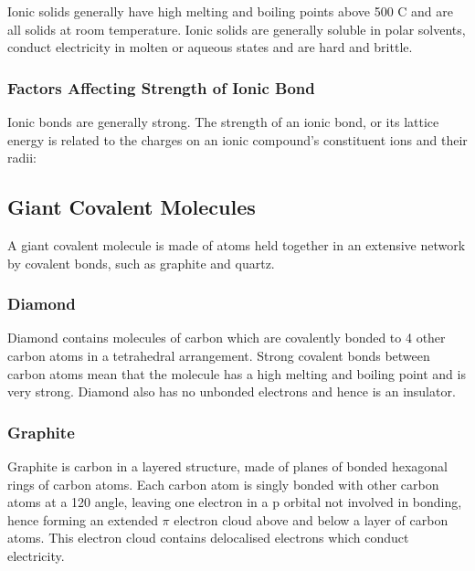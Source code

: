 \documentclass[../main]{subfiles}
\begin{document}

	Ionic solids generally have high melting and boiling points above 500 \degree C and are all solids at room temperature. Ionic solids are generally soluble in polar solvents, conduct electricity in molten or aqueous states and are hard and brittle.

	\subsubsection{Factors Affecting Strength of Ionic Bond}


	Ionic bonds are generally strong. The strength of an ionic bond, or its lattice energy is related to the charges on an ionic compound's constituent ions and their radii:


	\subsection{Giant Covalent Molecules}

	A giant covalent molecule is made of atoms held together in an extensive network by covalent bonds, such as graphite and quartz.

	\subsubsection{Diamond}

	Diamond contains molecules of carbon which are covalently bonded to 4 other carbon atoms in a tetrahedral arrangement. Strong  covalent bonds between carbon atoms mean that the molecule has a high melting and boiling point and is very strong. Diamond also has no unbonded electrons and hence is an insulator.

	\subsubsection{Graphite}

	Graphite is carbon in a layered structure, made of planes of bonded hexagonal rings of carbon atoms. Each carbon atom is singly bonded with other carbon atoms at a 120 \degree angle, leaving one electron in a p orbital not involved in bonding, hence forming an extended \(\pi\) electron cloud above and below a layer of carbon atoms. This electron cloud contains delocalised electrons which conduct electricity. \\
\end{document}
